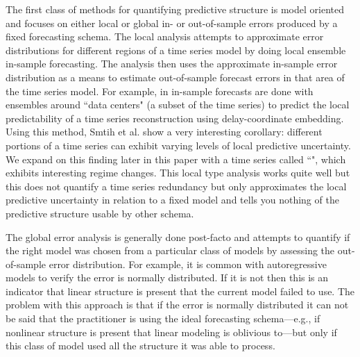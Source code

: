The first class of methods for quantifying predictive structure is model oriented and focuses on either local or global in- or out-of-sample errors produced by a fixed forecasting schema. The local analysis attempts to approximate error distributions for different regions of a time series model by doing local ensemble in-sample forecasting. The analysis then uses the approximate in-sample error distribution as a means to estimate out-of-sample forecast errors in that area of the time series model. For example, in \cite{Smith199250} in-sample forecasts are done with ensembles around ``data centers" (a subset of the time series) to predict the local predictability of a time series reconstruction using delay-coordinate embedding. Using this method, Smtih et al. \cite{Smith199250} show  a very interesting corollary: different portions of a time series can exhibit varying levels of local predictive uncertainty.  We expand on this finding later in this paper with a time series called ``\svd", which exhibits interesting regime changes.
This local type analysis works quite well but this does not quantify a time series redundancy but only approximates the local predictive uncertainty in relation to a fixed model and tells you nothing of the predictive structure usable by other schema. 

The global error analysis is generally done post-facto and attempts to quantify if the right model was chosen from a particular class of models by assessing the out-of-sample error distribution. For example, it is common with autoregressive models to verify the error is normally distributed. If it is not then this is an indicator that linear structure is present that the current model failed to use. The problem with this approach is that if the error is normally distributed it can not be said that the practitioner is using the ideal forecasting schema---e.g., if nonlinear structure is present that linear modeling is oblivious to---but only if this class of model used all the structure it was able to process.


